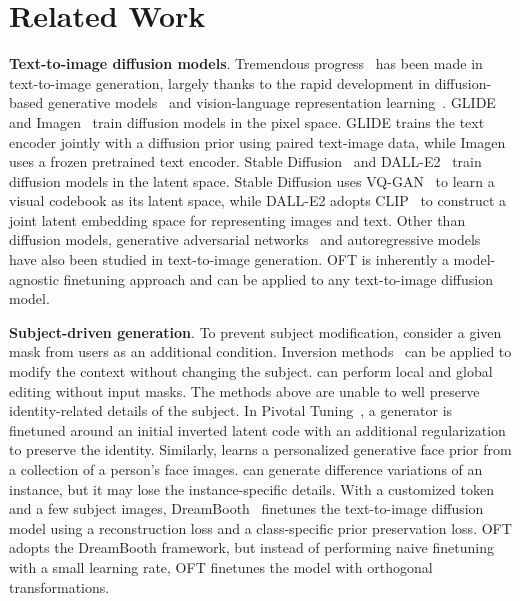\section{Related Work}

\textbf{Text-to-image diffusion models}. Tremendous progress~\cite{saharia2022photorealistic,ramesh2022hierarchical,rombach2022high,gu2022vector,nichol2022glide} has been made in text-to-image generation, largely thanks to the rapid development in diffusion-based generative models~\cite{ho2020denoising,song2021score,song2021denoising,dhariwal2021diffusion} and vision-language representation learning~\cite{su2020vlbert,lu2019vilbert,radford2021learning,wang2021simvlm,li2022blip,li2023blip,alayrac2022flamingo,schuhmann2022laion}. GLIDE~\cite{nichol2022glide} and Imagen~\cite{saharia2022photorealistic} train diffusion models in the pixel space. GLIDE trains the text encoder jointly with a diffusion prior using paired text-image data, while Imagen uses a frozen pretrained text encoder. Stable Diffusion~\cite{rombach2022high} and DALL-E2~\cite{ramesh2022hierarchical} train diffusion models in the latent space. Stable Diffusion uses VQ-GAN~\cite{esser2021taming} to learn a visual codebook as its latent space, while DALL-E2 adopts CLIP~\cite{radford2021learning} to construct a joint latent embedding space for representing images and text. Other than diffusion models, generative adversarial networks~\cite{reed2016generative,zhang2017stackgan,xu2018attngan,li2019controllable} and autoregressive models~\cite{ramesh2021zero,ding2021cogview,wu2022nuwa,yuscaling} have also been studied in text-to-image generation. OFT is inherently a model-agnostic finetuning approach and can be applied to any text-to-image diffusion model.

\textbf{Subject-driven generation}. To prevent subject modification, \cite{avrahami2022blended,nichol2022glide} consider a given mask from users as an additional condition. Inversion methods~\cite{choi2021ilvr,dhariwal2021diffusion,ramesh2022hierarchical,gal2022image} can be applied to modify the context without changing the subject. \cite{hertz2022prompt} can perform local and global editing without input masks. The methods above are unable to well preserve identity-related details of the subject. In Pivotal Tuning~\cite{roich2022pivotal}, a generator is finetuned around an initial inverted latent code with an additional regularization to preserve the identity. Similarly, \cite{nitzan2022mystyle} learns a personalized generative face prior from a collection of a person's face images. \cite{casanova2021instance} can generate difference variations of an instance, but it may lose the instance-specific details. With a customized token and a few subject images, DreamBooth~\cite{ruiz2023dreambooth} finetunes the text-to-image diffusion model using a reconstruction loss and a class-specific prior preservation loss. OFT adopts the DreamBooth framework, but instead of performing naive finetuning with a small learning rate, OFT finetunes the model with orthogonal transformations.

